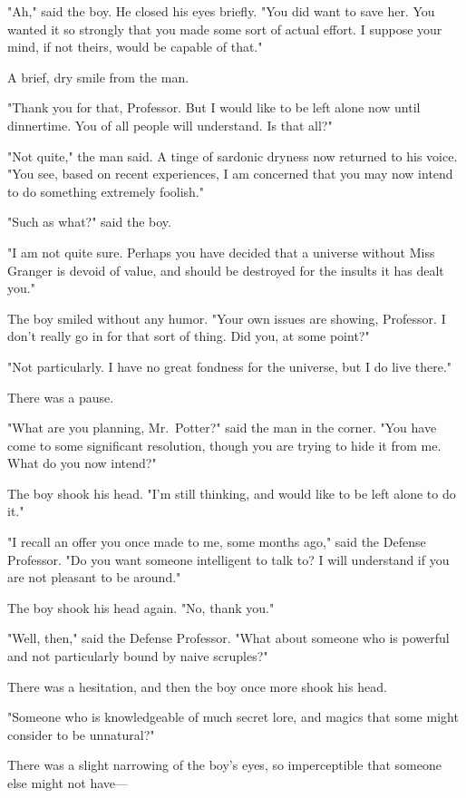 "Ah," said the boy. He closed his eyes briefly. "You did want to save her. You 
wanted it so strongly that you made some sort of actual effort. I suppose your 
mind, if not theirs, would be capable of that."

A brief, dry smile from the man.

"Thank you for that, Professor. But I would like to be left alone now until 
dinnertime. You of all people will understand. Is that all?"

"Not quite," the man said. A tinge of sardonic dryness now returned to his 
voice. "You see, based on recent experiences, I am concerned that you may now 
intend to do something extremely foolish."

"Such as what?" said the boy.

"I am not quite sure. Perhaps you have decided that a universe without Miss 
Granger is devoid of value, and should be destroyed for the insults it has 
dealt you."

The boy smiled without any humor. "Your own issues are showing, Professor. I 
don't really go in for that sort of thing. Did you, at some point?"

"Not particularly. I have no great fondness for the universe, but I do live 
there."

There was a pause.

"What are you planning, Mr.~Potter?" said the man in the corner. "You have come 
to some significant resolution, though you are trying to hide it from me. What 
do you now intend?"

The boy shook his head. "I'm still thinking, and would like to be left alone to 
do it."

"I recall an offer you once made to me, some months ago," said the Defense 
Professor. "Do you want someone intelligent to talk to? I will understand if 
you are not pleasant to be around."

The boy shook his head again. "No, thank you."

"Well, then," said the Defense Professor. "What about someone who is powerful 
and not particularly bound by naive scruples?"

There was a hesitation, and then the boy once more shook his head.

"Someone who is knowledgeable of much secret lore, and magics that some might 
consider to be unnatural?"

There was a slight narrowing of the boy's eyes, so imperceptible that someone 
else might not have---

